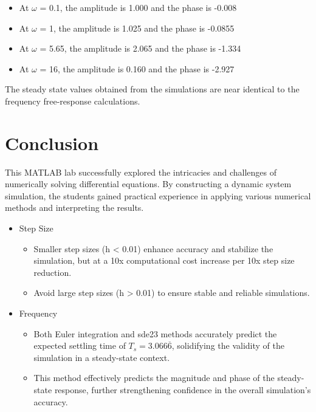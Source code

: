 \documentclass[12pt]{article}
\begin{document}
		\begin{itemize}
			\item At $\omega$ = 0.1, the amplitude is 1.000 and the phase is -0.008
			\item At $\omega$ = 1, the amplitude is 1.025 and the phase is -0.0855
			\item At $\omega$ = 5.65, the amplitude is 2.065 and the phase is -1.334
			\item At $\omega$ = 16, the amplitude is 0.160 and the phase is -2.927
		\end{itemize}
		
		The steady state values obtained from the simulations are near identical to the frequency free-response calculations. 
	\section{Conclusion}
	This MATLAB lab successfully explored the intricacies and challenges of numerically solving differential equations. By constructing a dynamic system simulation, the students gained practical experience in applying various numerical methods and interpreting the results.
	
	\begin{itemize}
		\item Step Size
			\begin{itemize}
				\item Smaller step sizes (h < 0.01) enhance accuracy and stabilize the simulation, but at a 10x computational cost increase per 10x step size reduction.
				\item Avoid large step sizes (h > 0.01) to ensure stable and reliable simulations.
			\end{itemize}
		\item Frequency
			\begin{itemize}
				\item Both Euler integration and sde23 methods accurately predict the expected settling time of $T_s = 3.066\overline{6}$, solidifying the validity of the simulation in a steady-state context.
				\item This method effectively predicts the magnitude and phase of the steady-state response, further strengthening confidence in the overall simulation's accuracy.
			\end{itemize}
			
	\end{itemize}
	

	
\end{document}
